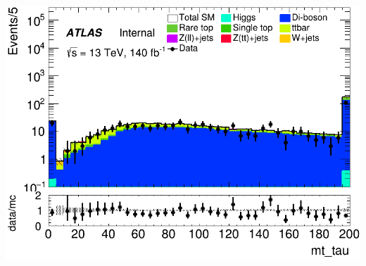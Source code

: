 \documentclass[usenames,dvipsnames]{beamer}
\begin{document}
\begin{frame}
\begin{minipage}{0.32\textwidth}
        \includegraphics[width=\textwidth]{graphics/LLL_met/LLL_met_mt_tau.png}
    \end{minipage}
    
    \vspace{0.5cm} %


\end{frame}
\end{document}
